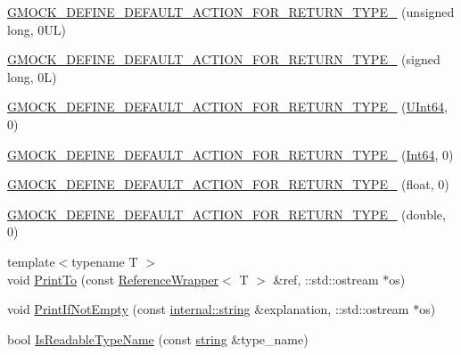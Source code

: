 \begin{DoxyCompactItemize}
\item 
\hyperlink{namespacetesting_1_1internal_a1f4167b954a7ff0074ce8a5bb855f86f}{G\+M\+O\+C\+K\+\_\+\+D\+E\+F\+I\+N\+E\+\_\+\+D\+E\+F\+A\+U\+L\+T\+\_\+\+A\+C\+T\+I\+O\+N\+\_\+\+F\+O\+R\+\_\+\+R\+E\+T\+U\+R\+N\+\_\+\+T\+Y\+P\+E\+\_\+} (unsigned long, 0\+U\+L)
\item 
\hyperlink{namespacetesting_1_1internal_ad8804e25537427755c324ab03a72e776}{G\+M\+O\+C\+K\+\_\+\+D\+E\+F\+I\+N\+E\+\_\+\+D\+E\+F\+A\+U\+L\+T\+\_\+\+A\+C\+T\+I\+O\+N\+\_\+\+F\+O\+R\+\_\+\+R\+E\+T\+U\+R\+N\+\_\+\+T\+Y\+P\+E\+\_\+} (signed long, 0\+L)
\item 
\hyperlink{namespacetesting_1_1internal_ad2efcdbd12c7c020745b87bcc0997809}{G\+M\+O\+C\+K\+\_\+\+D\+E\+F\+I\+N\+E\+\_\+\+D\+E\+F\+A\+U\+L\+T\+\_\+\+A\+C\+T\+I\+O\+N\+\_\+\+F\+O\+R\+\_\+\+R\+E\+T\+U\+R\+N\+\_\+\+T\+Y\+P\+E\+\_\+} (\hyperlink{namespacetesting_1_1internal_aa6a1ac454e6d7e550fa4925c62c35caa}{U\+Int64}, 0)
\item 
\hyperlink{namespacetesting_1_1internal_ab427739121a380a7934bda96153f053d}{G\+M\+O\+C\+K\+\_\+\+D\+E\+F\+I\+N\+E\+\_\+\+D\+E\+F\+A\+U\+L\+T\+\_\+\+A\+C\+T\+I\+O\+N\+\_\+\+F\+O\+R\+\_\+\+R\+E\+T\+U\+R\+N\+\_\+\+T\+Y\+P\+E\+\_\+} (\hyperlink{namespacetesting_1_1internal_a271c563fec38b804ddab0677f51f70a8}{Int64}, 0)
\item 
\hyperlink{namespacetesting_1_1internal_a71c697e5b567365fd3ff6c720769633b}{G\+M\+O\+C\+K\+\_\+\+D\+E\+F\+I\+N\+E\+\_\+\+D\+E\+F\+A\+U\+L\+T\+\_\+\+A\+C\+T\+I\+O\+N\+\_\+\+F\+O\+R\+\_\+\+R\+E\+T\+U\+R\+N\+\_\+\+T\+Y\+P\+E\+\_\+} (float, 0)
\item 
\hyperlink{namespacetesting_1_1internal_a7ba92aa33f4968c902623cd02e445020}{G\+M\+O\+C\+K\+\_\+\+D\+E\+F\+I\+N\+E\+\_\+\+D\+E\+F\+A\+U\+L\+T\+\_\+\+A\+C\+T\+I\+O\+N\+\_\+\+F\+O\+R\+\_\+\+R\+E\+T\+U\+R\+N\+\_\+\+T\+Y\+P\+E\+\_\+} (double, 0)
\item 
{\footnotesize template$<$typename T $>$ }\\void \hyperlink{namespacetesting_1_1internal_a8fd10cc30084c36a89c74868c8bd53f8}{Print\+To} (const \hyperlink{classtesting_1_1internal_1_1_reference_wrapper}{Reference\+Wrapper}$<$ T $>$ \&ref, \+::std\+::ostream $\ast$os)
\item 
void \hyperlink{namespacetesting_1_1internal_afa4cd5d7933878d6d820b32c87bb2767}{Print\+If\+Not\+Empty} (const \hyperlink{namespacetesting_1_1internal_a8e8ff5b11e64078831112677156cb111}{internal\+::string} \&explanation, \+::std\+::ostream $\ast$os)
\item 
bool \hyperlink{namespacetesting_1_1internal_a19a5d50382569ce6ee94e2b68ddc6fc7}{Is\+Readable\+Type\+Name} (const \hyperlink{namespacetesting_1_1internal_a8e8ff5b11e64078831112677156cb111}{string} \&type\+\_\+name)

\end{DoxyCompactItemize}
